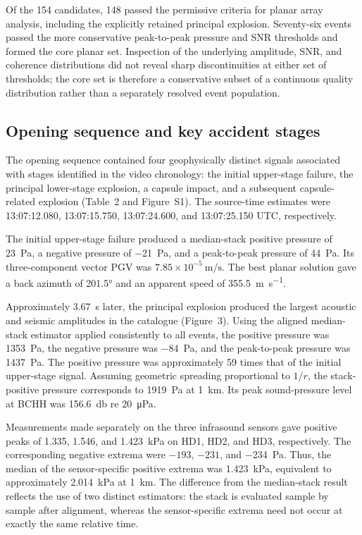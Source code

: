 \documentclass[12pt]{article}
\begin{document}
Of the 154 candidates, 148 passed the permissive criteria for planar array
analysis, including the explicitly retained principal explosion. Seventy-six
events passed the more conservative peak-to-peak pressure and SNR thresholds and
formed the core planar set. Inspection of the underlying amplitude, SNR, and
coherence distributions did not reveal sharp discontinuities at either set of
thresholds; the core set is therefore a conservative subset of a continuous
quality distribution rather than a separately resolved event population.

\subsection{Opening sequence and key accident stages}

The opening sequence contained four geophysically distinct signals associated
with stages identified in the video chronology: the initial upper-stage failure,
the principal lower-stage explosion, a capsule impact, and a subsequent
capsule-related explosion (Table~2 and Figure~S1). The source-time estimates were
13:07:12.080, 13:07:15.750, 13:07:24.600, and 13:07:25.150 UTC, respectively.

The initial upper-stage failure produced a median-stack positive pressure of
\SI{23}{\pascal}, a negative pressure of \SI{-21}{\pascal}, and a peak-to-peak
pressure of \SI{44}{\pascal}. Its three-component vector PGV was
$7.85\times10^{-5}\ \si{\metre\per\second}$. The best planar solution gave a
back azimuth of \ang{201.5} and an apparent speed of
\SI{355.5}{\metre\per\second}.

Approximately \SI{3.67}{\second} later, the principal explosion produced the
largest acoustic and seismic amplitudes in the catalogue (Figure~3). Using the
aligned median-stack estimator applied consistently to all events, the positive
pressure was \SI{1353}{\pascal}, the negative pressure was
\SI{-84}{\pascal}, and the peak-to-peak pressure was \SI{1437}{\pascal}. The
positive pressure was approximately 59 times that of the initial upper-stage
signal. Assuming geometric spreading proportional to $1/r$, the stack-positive
pressure corresponds to \SI{1919}{\pascal} at \SI{1}{\kilo\metre}. Its peak
sound-pressure level at BCHH was \SI{156.6}{\decibel} re
\SI{20}{\micro\pascal}.

Measurements made separately on the three infrasound sensors gave positive
peaks of 1.335, 1.546, and \SI{1.423}{\kilo\pascal} on HD1, HD2, and HD3,
respectively. The corresponding negative extrema were $-193$, $-231$, and
\SI{-234}{\pascal}. Thus, the median of the sensor-specific positive extrema was
\SI{1.423}{\kilo\pascal}, equivalent to approximately
\SI{2.014}{\kilo\pascal} at \SI{1}{\kilo\metre}. The difference from the
median-stack result reflects the use of two distinct estimators: the stack is
evaluated sample by sample after alignment, whereas the sensor-specific extrema
need not occur at exactly the same relative time.
\end{document}
